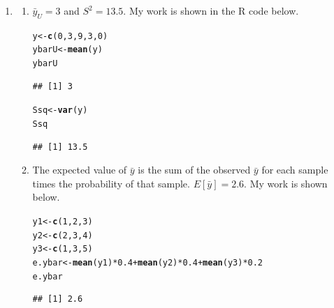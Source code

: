 \documentclass[12pt]{article}\usepackage[]{graphicx}\usepackage[]{color}
\makeatletter
\newcommand{\hlnum}[1]{\textcolor[rgb]{0.686,0.059,0.569}{#1}}%
\newcommand{\hlopt}[1]{\textcolor[rgb]{0,0,0}{#1}}%
\newcommand{\hlstd}[1]{\textcolor[rgb]{0.345,0.345,0.345}{#1}}%
\newcommand{\hlkwb}[1]{\textcolor[rgb]{0.69,0.353,0.396}{#1}}%
\newcommand{\hlkwd}[1]{\textcolor[rgb]{0.737,0.353,0.396}{\textbf{#1}}}%
\newenvironment{kframe}{%
 \def\at@end@of@kframe{}%
 \ifinner\ifhmode%
  \def\at@end@of@kframe{\end{minipage}}%
  \begin{minipage}{\columnwidth}%
 \fi\fi%
 \def\FrameCommand##1{\hskip\@totalleftmargin \hskip-\fboxsep
 \colorbox{shadecolor}{##1}\hskip-\fboxsep
     \hskip-\linewidth \hskip-\@totalleftmargin \hskip\columnwidth}%
 \MakeFramed {\advance\hsize-\width
   \@totalleftmargin\z@ \linewidth\hsize
   \@setminipage}}%
 {\par\unskip\endMakeFramed%
 \at@end@of@kframe}
\newenvironment{knitrout}{}{} %
\makeatother
\begin{document}
\begin{doublespacing}
\begin{enumerate}
\item \begin{enumerate}
\item $\bar{y}_U = 3$ and $S^2 = 13.5$. My work is shown in the R code below. 
\begin{knitrout}\footnotesize
{}\color{fgcolor}\begin{kframe}
\begin{alltt}
\hlstd{y} \hlkwb{<-} \hlkwd{c}\hlstd{(}\hlnum{0}\hlstd{,} \hlnum{3}\hlstd{,} \hlnum{9}\hlstd{,} \hlnum{3}\hlstd{,} \hlnum{0}\hlstd{)}
\hlstd{ybarU} \hlkwb{<-} \hlkwd{mean}\hlstd{(y)}
\hlstd{ybarU}
\end{alltt}
\begin{verbatim}
## [1] 3
\end{verbatim}
\begin{alltt}
\hlstd{Ssq} \hlkwb{<-} \hlkwd{var}\hlstd{(y)}
\hlstd{Ssq}
\end{alltt}
\begin{verbatim}
## [1] 13.5
\end{verbatim}
\end{kframe}
\end{knitrout}

\item The expected value of $\bar{y}$ is the sum of the observed $\bar{y}$ for each sample times the probability of that sample. $E[\bar{y}]=2.6$. My work is shown below. 

\begin{knitrout}\footnotesize
{}\color{fgcolor}\begin{kframe}
\begin{alltt}
\hlstd{y1} \hlkwb{<-} \hlkwd{c}\hlstd{(}\hlnum{1}\hlstd{,}\hlnum{2}\hlstd{,}\hlnum{3}\hlstd{)}
\hlstd{y2} \hlkwb{<-} \hlkwd{c}\hlstd{(}\hlnum{2}\hlstd{,}\hlnum{3}\hlstd{,}\hlnum{4}\hlstd{)}
\hlstd{y3} \hlkwb{<-} \hlkwd{c}\hlstd{(}\hlnum{1}\hlstd{,}\hlnum{3}\hlstd{,}\hlnum{5}\hlstd{)}
\hlstd{e.ybar} \hlkwb{<-} \hlkwd{mean}\hlstd{(y1)}\hlopt{*}\hlnum{0.4} \hlopt{+} \hlkwd{mean}\hlstd{(y2)}\hlopt{*}\hlnum{0.4} \hlopt{+} \hlkwd{mean}\hlstd{(y3)}\hlopt{*}\hlnum{0.2}
\hlstd{e.ybar}
\end{alltt}
\begin{verbatim}
## [1] 2.6
\end{verbatim}
\end{kframe}
\end{knitrout}


\end{enumerate}
\end{enumerate}
\end{doublespacing}
\end{document}

